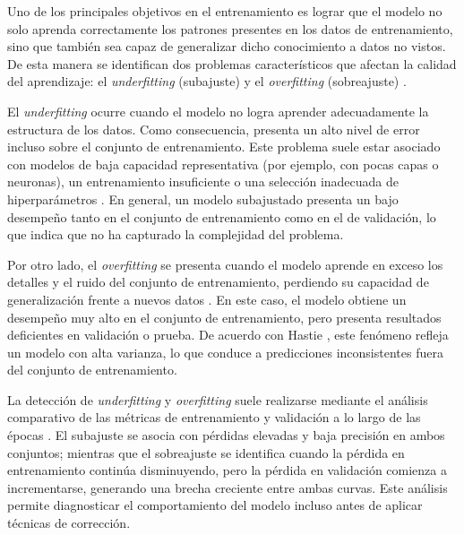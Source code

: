 	Uno de los principales objetivos en el entrenamiento es lograr que el modelo no solo aprenda correctamente los patrones presentes en los datos de entrenamiento, sino que también sea capaz de generalizar dicho conocimiento a datos no vistos. De esta manera se identifican dos problemas característicos que afectan la calidad del aprendizaje: el \textit{underfitting} (subajuste) y el \textit{overfitting} (sobreajuste) \cite{goodfellow2016dl, geron2019}.
	
	El \textit{underfitting} ocurre cuando el modelo no logra aprender adecuadamente la estructura de los datos. Como consecuencia, presenta un alto nivel de error incluso sobre el conjunto de entrenamiento. Este problema suele estar asociado con modelos de baja capacidad representativa (por ejemplo, con pocas capas o neuronas), un entrenamiento insuficiente o una selección inadecuada de hiperparámetros \cite{goodfellow2016dl}. En general, un modelo subajustado presenta un bajo desempeño tanto en el conjunto de entrenamiento como en el de validación, lo que indica que no ha capturado la complejidad del problema.
	
	Por otro lado, el \textit{overfitting} se presenta cuando el modelo aprende en exceso los detalles y el ruido del conjunto de entrenamiento, perdiendo su capacidad de generalización frente a nuevos datos \cite{goodfellow2016dl, hastie2009}. En este caso, el modelo obtiene un desempeño muy alto en el conjunto de entrenamiento, pero presenta resultados deficientes en validación o prueba. De acuerdo con Hastie \cite{hastie2009}, este fenómeno refleja un modelo con alta varianza, lo que conduce a predicciones inconsistentes fuera del conjunto de entrenamiento.
	
	La detección de \textit{underfitting} y \textit{overfitting} suele realizarse mediante el análisis comparativo de las métricas de entrenamiento y validación a lo largo de las épocas \cite{geron2019}. El subajuste se asocia con pérdidas elevadas y baja precisión en ambos conjuntos; mientras que el sobreajuste se identifica cuando la pérdida en entrenamiento continúa disminuyendo, pero la pérdida en validación comienza a incrementarse, generando una brecha creciente entre ambas curvas. Este análisis permite diagnosticar el comportamiento del modelo incluso antes de aplicar técnicas de corrección.
	
	
	\small
	\renewcommand{\arraystretch}{1.2}
	
